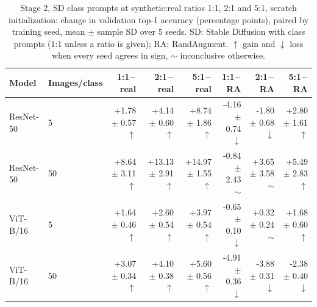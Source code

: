 \begin{table}[H]
\centering
\small
\setlength{\tabcolsep}{4pt}
\caption{Stage 2, SD class prompts at synthetic:real ratios 1:1, 2:1 and 5:1, scratch initialization: change in validation top-1 accuracy (percentage points), paired by training seed, mean $\pm$ sample SD over 5 seeds. SD: Stable Diffusion with class prompts (1:1 unless a ratio is given); RA: RandAugment. $\uparrow$ gain and $\downarrow$ loss when every seed agrees in sign, $\sim$ inconclusive otherwise.}
\label{tab:stage2-ratio-scratch}
\begin{tabular}{llrrrrrr}
\toprule
Model & Images/class & 1:1$-$real & 2:1$-$real & 5:1$-$real & 1:1$-$RA & 2:1$-$RA & 5:1$-$RA \\
\midrule
ResNet-50 & 5 & +1.78 $\pm$ 0.57 $\uparrow$ & +4.14 $\pm$ 0.60 $\uparrow$ & +8.74 $\pm$ 1.86 $\uparrow$ & -4.16 $\pm$ 0.74 $\downarrow$ & -1.80 $\pm$ 0.68 $\downarrow$ & +2.80 $\pm$ 1.61 $\uparrow$ \\
ResNet-50 & 50 & +8.64 $\pm$ 3.11 $\uparrow$ & +13.13 $\pm$ 2.91 $\uparrow$ & +14.97 $\pm$ 1.55 $\uparrow$ & -0.84 $\pm$ 2.43 $\sim$ & +3.65 $\pm$ 3.58 $\sim$ & +5.49 $\pm$ 2.83 $\uparrow$ \\
\midrule
ViT-B/16 & 5 & +1.64 $\pm$ 0.46 $\uparrow$ & +2.60 $\pm$ 0.54 $\uparrow$ & +3.97 $\pm$ 0.54 $\uparrow$ & -0.65 $\pm$ 0.10 $\downarrow$ & +0.32 $\pm$ 0.24 $\sim$ & +1.68 $\pm$ 0.60 $\uparrow$ \\
ViT-B/16 & 50 & +3.07 $\pm$ 0.34 $\uparrow$ & +4.10 $\pm$ 0.38 $\uparrow$ & +5.60 $\pm$ 0.56 $\uparrow$ & -4.91 $\pm$ 0.36 $\downarrow$ & -3.88 $\pm$ 0.31 $\downarrow$ & -2.38 $\pm$ 0.40 $\downarrow$ \\
\bottomrule
\end{tabular}
\end{table}
